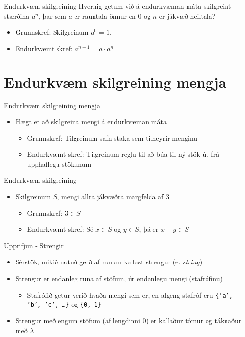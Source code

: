 \documentclass[handout]{beamer}
\begin{document}
\begin{frame}{Endurkvæm skilgreining}
Hvernig getum við á endurkvæman máta skilgreint stærðina $a^n$, þar sem $a$ er rauntala önnur en $0$ og $n$ er jákvæð heiltala?
\pause
\begin{itemize}
 \item Grunnskref: Skilgreinum $a^0 = 1$.
 \item Endurkvæmt skref: $a^{n+1} = a \cdot a^n$
\end{itemize}
\end{frame}

\section{Endurkvæm skilgreining mengja}

\begin{frame}{Endurkvæm skilgreining mengja}
\begin{itemize}
 \item Hægt er að skilgreina mengi á endurkvæman máta 
 \begin{itemize}
  \item Grunnskref: Tilgreinum safn staka sem tilheyrir menginu
  \item Endurkvæmt skref: Tilgreinum reglu til að búa til ný stök út frá upphaflegu stökunum
 \end{itemize}
\end{itemize}
\end{frame}

\begin{frame}{Endurkvæm skilgreining}
\begin{itemize}
 \item Skilgreinum $S$, mengi allra jákvæðra margfelda af $3$:
 \begin{itemize}
  \item Grunnskref: $3 \in S$
  \item Endurkvæmt skref: Sé $x \in S$ og $y \in S$, þá er $x+y \in S$
 \end{itemize}
\end{itemize}
\end{frame}

\begin{frame}[fragile]{Upprifjun - Strengir}
\begin{itemize}
 \item Sérstök, mikið notuð gerð af runum kallast strengur (e. \emph{string})
 \item Strengur er endanleg runa af stöfum, úr endanlegu mengi (stafrófinu)
 \begin{itemize}
  \item Stafrófið getur verið hvaða mengi sem er, en algeng stafróf eru \texttt{\{'a', 'b', 'c', \ldots\}} og \texttt{\{0, 1\}}
 \end{itemize}
 \item Strengur með engum stöfum (af lengdinni $0$) er kallaður tómur og táknaður með $\lambda$
\end{itemize}
\end{frame}
\end{document}
